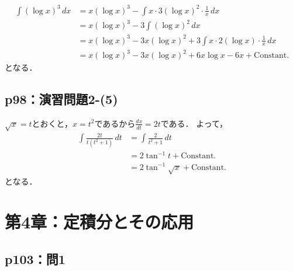 \documentclass[uplatex,dvipdfmx,a4paper,10pt,fleqn]{jsarticle}
\begin{document}
\begin{tleftbar}
\begin{align*} 
    \int (\log x)^3 \, dx & = x (\log x)^3 - \int x \cdot 3 (\log x)^2 \cdot \frac{1}{x} \, dx \\
    & = x(\log x)^3- 3  \int (\log x)^2 \, dx \\
    & = x(\log x)^3 - 3x (\log x)^2 + 3\int x \cdot 2 (\log x )\cdot \frac{1}{x} \, dx \\
    & = x (\log x)^3 - 3x (\log x)^2 + 6 x\log x - 6x+\mathrm{Constant.}
\end{align*} 
となる．
\end{tleftbar}


\subsection*{p98：演習問題2-(5)}

\begin{tleftbar}
    $\sqrt{x}=t$とおくと，$ x =t^2$であるから$ \frac{dx}{dt}=2t$である．
    よって，
    \begin{align*}
        \int \frac{2t}{t (t^2+1)} \, dt & = \int \frac{2}{t^2+1}\, dt \\
        & = 2 \tan^{-1} t + \mathrm{Constant.}\\
        & = 2 \tan^{-1} \sqrt{x} + \mathrm{Constant.}
    \end{align*} 
    となる．
\end{tleftbar}


\newpage 

\section*{第4章：定積分とその応用}


\subsection*{p103：問1}
\end{document}
